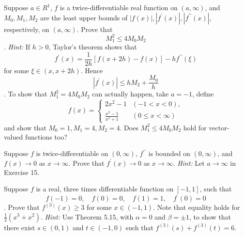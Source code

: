   \begin{exercise}[Rudin 5.15]
    Suppose $a \in R^1$, $f$ is a twice-differentiable real function on $(a, \infty)$, and $M_0, M_1, M_2$ are the least upper bounds of $|f(x)|, |f^\prime(x)|, |f^{\prime\prime}(x)|$, respectively, on $(a, \infty)$. Prove that
    \begin{equation}
      M_1^2 \le 4M_0 M_2
    \end{equation}
   . \textit{Hint:} If $h > 0$, Taylor's theorem shows that
    \begin{equation}
      f^\prime(x) = \frac{1}{2h} [f(x + 2h) - f(x)] - hf^{\prime\prime}(\xi)
    \end{equation}
    for some $\xi \in (x, x + 2h)$. Hence
    \begin{equation}
      |f^\prime(x)| \le hM_2 + \frac{M_0}{h}
    \end{equation}
   . To show that $M_1^2 = 4M_0 M_2$ can actually happen, take $a = -1$, define
    \begin{equation}
      f(x) = 
      \begin{cases}
        2x^2 - 1 & (-1 < x < 0), \\
        \frac{x^2 - 1}{x^2 + 1} & (0 \le x < \infty)
      \end{cases}
    \end{equation}
    and show that $M_0 = 1, M_1 = 4, M_2 = 4$. Does $M_1^2 \le 4M_0 M_2$ hold for vector-valued functions too?
  \end{exercise}
  \begin{solution}

  \end{solution}

  \begin{exercise}[Rudin 5.16]
    Suppose $f$ is twice-differentiable on $(0, \infty)$, $f^{\prime\prime}$ is bounded on $(0, \infty)$, and $f(x) \to 0$ as $x \to \infty$. Prove that $f^\prime(x) \to 0$ as $x \to \infty$. \textit{Hint:} Let $a \to \infty$ in Exercise 15.
  \end{exercise}
  \begin{solution}

  \end{solution}

  \begin{exercise}[Rudin 5.17]
    Suppose $f$ is a real, three times differentiable function on $[-1, 1]$, such that
    \begin{equation}
      f(-1) = 0, \quad f(0) = 0, \quad f(1) = 1, \quad f^\prime(0) = 0
    \end{equation}
   . Prove that $f^{(3)}(x) \ge 3$ for some $x \in (-1, 1)$. Note that equality holds for $\frac{1}{2}(x^3 + x^2)$. \textit{Hint:} Use Theorem 5.15, with $\alpha = 0$ and $\beta = \pm 1$, to show that there exist $s \in (0, 1)$ and $t \in (-1, 0)$ such that $f^{(3)}(s) + f^{(3)}(t) = 6$.
  \end{exercise}
  \begin{solution}

  \end{solution}

